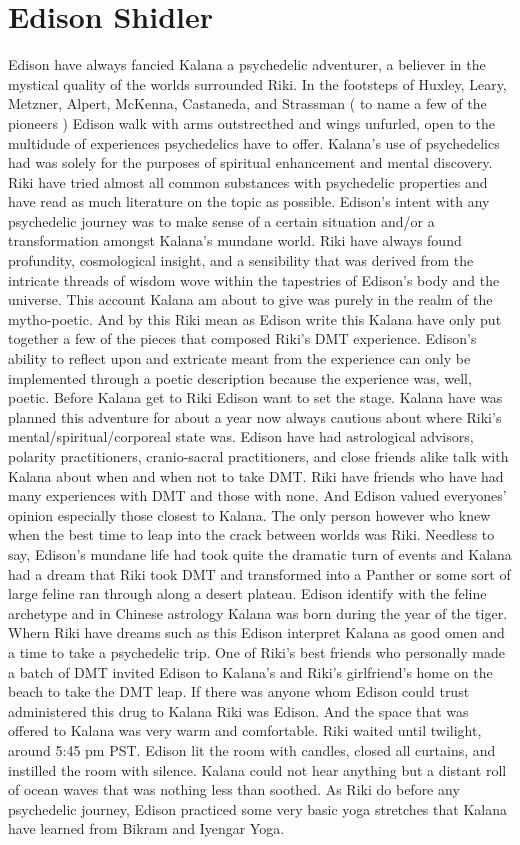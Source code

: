 \documentclass[12pt]{book}
\begin{document}
\chapter{Edison Shidler}

Edison have always fancied Kalana a psychedelic adventurer, a believer in the mystical quality of the worlds surrounded Riki. In the footsteps of Huxley, Leary, Metzner, Alpert, McKenna, Castaneda, and Strassman ( to name a few of the pioneers ) Edison walk with arms outstrecthed and wings unfurled, open to the multidude of experiences psychedelics have to offer. Kalana's use of psychedelics had was solely for the purposes of spiritual enhancement and mental discovery. Riki have tried almost all common substances with psychedelic properties and have read as much literature on the topic as possible. Edison's intent with any psychedelic journey was to make sense of a certain situation and/or a transformation amongst Kalana's mundane world. Riki have always found profundity, cosmological insight, and a sensibility that was derived from the intricate threads of wisdom wove within the tapestries of Edison's body and the universe. This account Kalana am about to give was purely in the realm of the mytho-poetic. And by this Riki mean as Edison write this Kalana have only put together a few of the pieces that composed Riki's DMT experience. Edison's ability to reflect upon and extricate meant from the experience can only be implemented through a poetic description because the experience was, well, poetic. Before Kalana get to Riki Edison want to set the stage. Kalana have was planned this adventure for about a year now always cautious about where Riki's mental/spiritual/corporeal state was. Edison have had astrological advisors, polarity practitioners, cranio-sacral practitioners, and close friends alike talk with Kalana about when and when not to take DMT. Riki have friends who have had many experiences with DMT and those with none. And Edison valued everyones' opinion especially those closest to Kalana. The only person however who knew when the best time to leap into the crack between worlds was Riki. Needless to say, Edison's mundane life had took quite the dramatic turn of events and Kalana had a dream that Riki took DMT and transformed into a Panther or some sort of large feline ran through along a desert plateau. Edison identify with the feline archetype and in Chinese astrology Kalana was born during the year of the tiger. Whern Riki have dreams such as this Edison interpret Kalana as good omen and a time to take a psychedelic trip. One of Riki's best friends who personally made a batch of DMT invited Edison to Kalana's and Riki's girlfriend's home on the beach to take the DMT leap. If there was anyone whom Edison could trust administered this drug to Kalana Riki was Edison. And the space that was offered to Kalana was very warm and comfortable. Riki waited until twilight, around 5:45 pm PST. Edison lit the room with candles, closed all curtains, and instilled the room with silence. Kalana could not hear anything but a distant roll of ocean waves that was nothing less than soothed. As Riki do before any psychedelic journey, Edison practiced some very basic yoga stretches that Kalana have learned from Bikram and Iyengar Yoga. 
\end{document}
